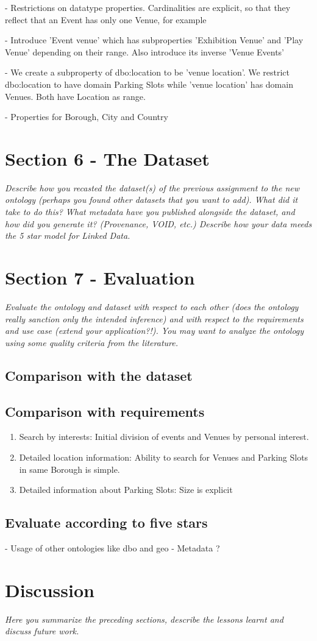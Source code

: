 \documentclass[runningheads,a4paper]{../../StyleFiles/llncs}
\begin{document}
- Restrictions on datatype properties. Cardinalities are explicit, so that they reflect that an Event has only one Venue, for example

- Introduce 'Event venue' which has subproperties 'Exhibition Venue' and 'Play Venue' depending on their range. Also introduce its inverse 'Venue Events'

- We create a subproperty of dbo:location to be 'venue location'. We restrict dbo:location to have domain Parking Slots while 'venue location' has domain Venues. Both have Location as range.

- Properties for Borough, City and Country


\section{Section 6 - The Dataset}
\textit{Describe how you recasted the dataset(s) of the previous assignment to the new ontology (perhaps you found other datasets that you want to add). What did it take to do this? What metadata have you published alongside the dataset, and how did you generate it? (Provenance, VOID, etc.) Describe how your data meeds the 5 star model for Linked Data.}


\section{Section 7 - Evaluation}
\textit{Evaluate the ontology and dataset with respect to each other (does the ontology really sanction only the intended inference) and with respect to the requirements and use case (extend your application?!). You may want to analyze the ontology using some quality criteria from the literature.}

\subsection{Comparison with the dataset}

\subsection{Comparison with requirements}
\begin{enumerate}
	\item Search by interests: Initial division of events and Venues by personal interest.
	\item Detailed location information: Ability to search for Venues and Parking Slots in same Borough is simple.
	\item Detailed information about Parking Slots: Size is explicit
\end{enumerate}

\subsection{Evaluate according to five stars}
- Usage of other ontologies like dbo and geo
- Metadata ?

\section{Discussion}
\textit{Here you summarize the preceding sections, describe the lessons learnt and discuss future work.}





\end{document}
